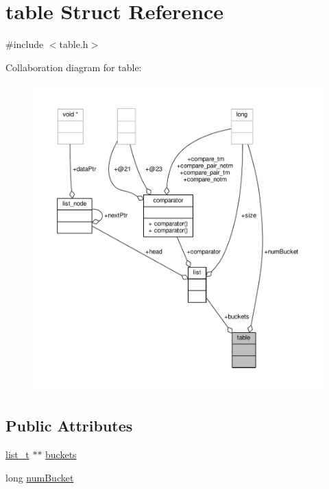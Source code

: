 \hypertarget{structtable}{\section{table Struct Reference}
\label{structtable}
}


{\ttfamily \#include $<$table.\-h$>$}



Collaboration diagram for table\-:
\nopagebreak
\begin{figure}[H]
\begin{center}
\leavevmode
\includegraphics[width=350pt]{structtable__coll__graph}
\end{center}
\end{figure}
\subsection*{Public Attributes}
\begin{DoxyCompactItemize}
\item 
\hyperlink{list_8h_af629e6a6713d7de11eab50cbe6449b06}{list\-\_\-t} $\ast$$\ast$ \hyperlink{structtable_a553b8c1676f4642aec256340cb37fc37}{buckets}
\item 
long \hyperlink{structtable_a647f756789799968e9287e04fc712f8e}{num\-Bucket}
\end{DoxyCompactItemize}



